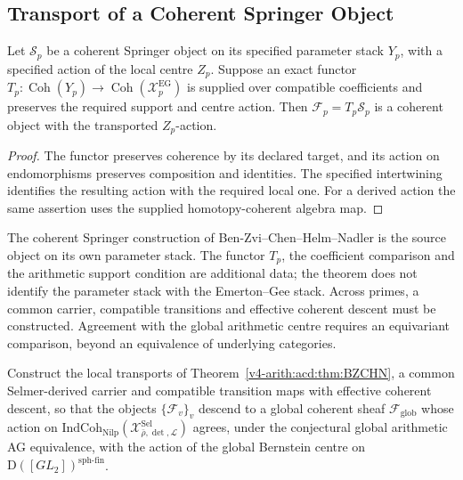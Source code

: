 \subsection{Transport of a Coherent Springer Object}
\begin{theorem}
\label{v4-arith:acd:thm:BZCHN}
Let \(\mathcal S_p\) be a coherent Springer object on its specified
parameter stack \(Y_p\), with a specified action of the local centre
\(Z_p\). Suppose an exact functor
\(T_p:\operatorname{Coh}(Y_p)\to
\operatorname{Coh}(\mathcal X_p^{\mathrm{EG}})\) is supplied over
compatible coefficients and preserves the required support and
centre action. Then \(\mathcal F_p=T_p\mathcal S_p\) is a coherent
object with the transported \(Z_p\)-action.
\end{theorem}
\begin{proof}
The functor preserves coherence by its declared target, and its
action on endomorphisms preserves composition and identities.
The specified intertwining identifies the resulting action with the
required local one. For a derived action the same assertion uses
the supplied homotopy-coherent algebra map.
\end{proof}
\begin{remark}
\label{v4-arith:acd:rem:BZCHN-supplies}
The coherent Springer construction of Ben-Zvi--Chen--Helm--Nadler
is the source object on its own parameter stack. The functor
\(T_p\), the coefficient comparison and the arithmetic support
condition are additional data; the theorem does not identify the
parameter stack with the Emerton--Gee stack. Across primes, a common
carrier, compatible transitions and effective coherent descent must
be constructed. Agreement with the global arithmetic centre requires
an equivariant comparison, beyond an equivalence of underlying
categories.
\end{remark}

\begin{conjecture}
\label{v4-arith:acd:cj:bc-diamond-glue-concrete}
Construct the local transports of
Theorem~\ref{v4-arith:acd:thm:BZCHN}, a common Selmer-derived
carrier and compatible transition maps with effective coherent
descent, so that the objects \(\{\mathcal F_v\}_v\) descend to a global
coherent sheaf \(\mathcal{F}_{\mathrm{glob}}\) whose action on
\(\mathrm{IndCoh}_{\mathrm{Nilp}}(\mathcal{X}^{\mathrm{Sel}}_{\bar\rho,\det,\mathcal{L}})\)
agrees, under the conjectural global arithmetic AG equivalence, with
the action of the global Bernstein centre on
\(\mathrm{D}([GL_{2}])^{\mathrm{sph\text{-}fin}}\).
\end{conjecture}

